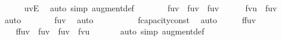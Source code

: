 {\ \ \ \ \isamarkupfalse%
\ {\isacartoucheopen}{\isacharparenleft}u{\isacharcomma}v{\isacharparenright}{\isasymin}E{\isacartoucheclose}\ \isamarkupfalse%
\ {\isacharparenleft}auto\ simp{\isacharcolon}\ augment{\isacharunderscore}def{\isacharparenright}\isanewline
\ \ \isamarkupfalse%
\ \isamarkupfalse%
\ {\isachardoublequoteopen}{\isasymdots}\ {\isasymge}\ f{\isacharparenleft}u{\isacharcomma}v{\isacharparenright}\ {\isacharplus}\ f{\isacharprime}{\isacharparenleft}u{\isacharcomma}v{\isacharparenright}\ {\isacharminus}\ f{\isacharparenleft}u{\isacharcomma}v{\isacharparenright}{\isachardoublequoteclose}\isanewline
\ \ \ \ \isamarkupfalse%
\ {\isacartoucheopen}f{\isacharprime}{\isacharparenleft}v{\isacharcomma}u{\isacharparenright}\ {\isasymle}\ f{\isacharparenleft}u{\isacharcomma}v{\isacharparenright}{\isacartoucheclose}\ \isamarkupfalse%
\ auto\isanewline
\ \ \isamarkupfalse%
\ \isamarkupfalse%
\ {\isachardoublequoteopen}{\isasymdots}\ {\isacharequal}\ f{\isacharprime}{\isacharparenleft}u{\isacharcomma}v{\isacharparenright}{\isachardoublequoteclose}\ \isamarkupfalse%
\ auto\isanewline
\ \ \isamarkupfalse%
\ \isamarkupfalse%
\ {\isachardoublequoteopen}{\isasymdots}\ {\isasymge}\ {}{\isachardoublequoteclose}\ \isamarkupfalse%
\ f{\isacharprime}{\isachardot}capacity{\isacharunderscore}const\ \isamarkupfalse%
\ auto\isanewline
\ \ \isamarkupfalse%
\ \isamarkupfalse%
\ {\isachardoublequoteopen}{\isacharparenleft}f{\isasymup}f{\isacharprime}{\isacharparenright}{\isacharparenleft}u{\isacharcomma}v{\isacharparenright}\ {\isasymge}\ {}{\isachardoublequoteclose}\ \isacommand{{\isachardot}}\isamarkupfalse%
\isanewline
\ \ \ \ \ \ \isanewline
\ \ \isamarkupfalse%
\ {\isachardoublequoteopen}{\isacharparenleft}f{\isasymup}f{\isacharprime}{\isacharparenright}{\isacharparenleft}u{\isacharcomma}v{\isacharparenright}\ {\isacharequal}\ f{\isacharparenleft}u{\isacharcomma}v{\isacharparenright}\ {\isacharplus}\ f{\isacharprime}{\isacharparenleft}u{\isacharcomma}v{\isacharparenright}\ {\isacharminus}\ f{\isacharprime}{\isacharparenleft}v{\isacharcomma}u{\isacharparenright}{\isachardoublequoteclose}\ \isanewline
\ \ \ \ \isamarkupfalse%
\ {\isacharparenleft}auto\ simp{\isacharcolon}\ augment{\isacharunderscore}def{\isacharparenright}\isanewline
\ \ \isamarkupfalse%
}
